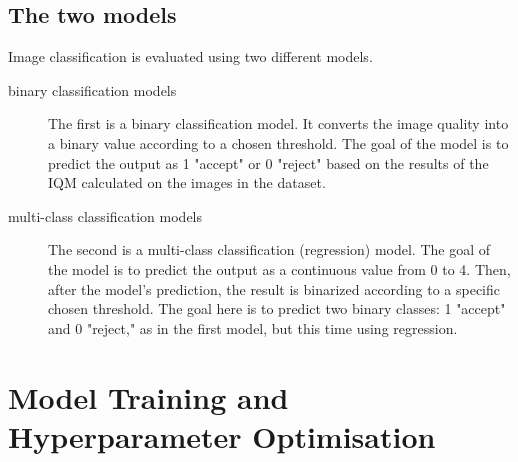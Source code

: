 \subsection{The two models}


Image classification is evaluated using two different models.
\begin{description}
    \item[binary classification models] The first is a binary classification model. It converts the image quality into a binary value according to a chosen threshold. The goal of the model is to predict the output as 1 "accept" or 0 "reject" based on the results of the IQM calculated on the images in the dataset.
    \item[multi-class classification models] The second is a multi-class classification (regression) model. The goal of the model is to predict the output as a continuous value from 0 to 4. Then, after the model's prediction, the result is binarized according to a specific chosen threshold. The goal here is to predict two binary classes: 1 "accept" and 0 "reject," as in the first model, but this time using regression.
\end{description}


\section{Model Training and Hyperparameter Optimisation}
\label{sec:model_training_optimisation}

